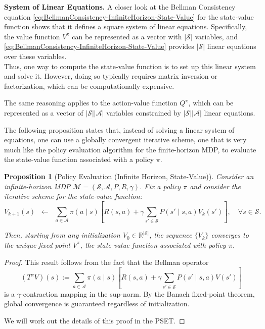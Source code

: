 \documentclass[
]{book}
\newtheorem{proposition}{Proposition}[chapter]
\theoremstyle{definition}
\theoremstyle{definition}
\theoremstyle{definition}
\theoremstyle{definition}
\theoremstyle{remark}
\begin{document}
\textbf{System of Linear Equations.} A closer look at the Bellman Consistency equation \eqref{eq:BellmanConsistency-InfiniteHorizon-State-Value} for the state-value function shows that it defines a square system of linear equations. Specifically, the value function \(V^{\pi}\) can be represented as a vector with \(|\mathcal{S}|\) variables, and \eqref{eq:BellmanConsistency-InfiniteHorizon-State-Value} provides \(|\mathcal{S}|\) linear equations over these variables.\\
Thus, one way to compute the state-value function is to set up this linear system and solve it. However, doing so typically requires matrix inversion or factorization, which can be computationally expensive.

The same reasoning applies to the action-value function \(Q^{\pi}\), which can be represented as a vector of \(|\mathcal{S}||\mathcal{A}|\) variables constrained by \(|\mathcal{S}||\mathcal{A}|\) linear equations.

The following proposition states that, instead of solving a linear system of equations, one can use a globally convergent iterative scheme, one that is very much like the policy evaluation algorithm for the finite-horizon MDP, to evaluate the state-value function associated with a policy \(\pi\).

\begin{proposition}[Policy Evaluation (Infinite Horizon, State-Value)]
\protect\hypertarget{prp:PolicyEvaluationInfiniteHorizonStateValue}{}\label{prp:PolicyEvaluationInfiniteHorizonStateValue}Consider an infinite-horizon MDP \(\mathcal{M}=(\mathcal{S},\mathcal{A},P,R,\gamma)\). Fix a policy \(\pi\) and consider the iterative scheme for the state-value function:
\begin{equation}
V_{k+1}(s) \;\; \gets \;\; \sum_{a \in \mathcal{A}} \pi(a \mid s) 
\left[ R(s,a) + \gamma \sum_{s' \in \mathcal{S}} P(s' \mid s,a) V_k(s') \right],
\quad \forall s \in \mathcal{S}.
\label{eq:PolicyEvaluationInfiniteHorizonStateValue}
\end{equation}

Then, starting from any initialization \(V_0 \in \mathbb{R}^{|\mathcal{S}|}\), the sequence \(\{V_k\}\) converges to the unique fixed point \(V^{\pi}\), the state-value function associated with policy \(\pi\).
\end{proposition}

\begin{proof}
This result follows from the fact that the Bellman operator
\[
(T^{\pi} V)(s) := \sum_{a \in \mathcal{A}} \pi(a \mid s) 
\left[ R(s,a) + \gamma \sum_{s' \in \mathcal{S}} P(s' \mid s,a) V(s') \right]
\]
is a \(\gamma\)-contraction mapping in the sup-norm. By the Banach fixed-point theorem, global convergence is guaranteed regardless of initialization.

We will work out the details of this proof in the PSET.
\end{proof}
\end{document}
